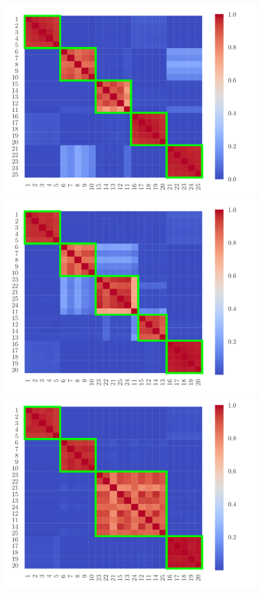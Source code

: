 \documentclass[twoside]{article}
\begin{document}
\begin{figure}[h]
\begin{center}
\includegraphics[scale=0.26]{../img/sim_shift8.pdf}
\includegraphics[scale=0.26]{../img/sim_shift16.pdf}
\includegraphics[scale=0.26]{../img/sim_shift32.pdf}

\end{center}
\end{figure}
\end{document}
